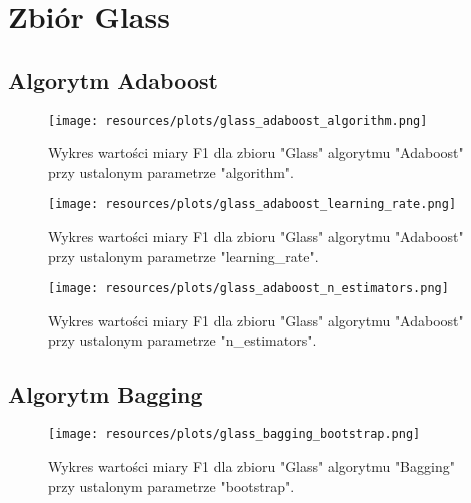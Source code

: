 \section{Zbiór Glass}
\subsection{Algorytm Adaboost}


\begin{figure}[H]
    \center
    \texttt{[image: resources/plots/glass\_adaboost\_algorithm.png]}
    \caption{Wykres wartości miary F1 dla zbioru "Glass" algorytmu "Adaboost" przy ustalonym parametrze "algorithm".}   
\end{figure}

\pagebreak
                    

\begin{figure}[H]
    \center
    \texttt{[image: resources/plots/glass\_adaboost\_learning\_rate.png]}
    \caption{Wykres wartości miary F1 dla zbioru "Glass" algorytmu "Adaboost" przy ustalonym parametrze "learning\_rate".}
\end{figure}

\pagebreak
                    

\begin{figure}[H]
    \center
    \texttt{[image: resources/plots/glass\_adaboost\_n\_estimators.png]}
    \caption{Wykres wartości miary F1 dla zbioru "Glass" algorytmu "Adaboost" przy ustalonym parametrze "n\_estimators".}
\end{figure}

\pagebreak
                    
\subsection{Algorytm Bagging}


\begin{figure}[H]
    \center
    \texttt{[image: resources/plots/glass\_bagging\_bootstrap.png]}
    \caption{Wykres wartości miary F1 dla zbioru "Glass" algorytmu "Bagging" przy ustalonym parametrze "bootstrap".}   
\end{figure}

\pagebreak
                    

